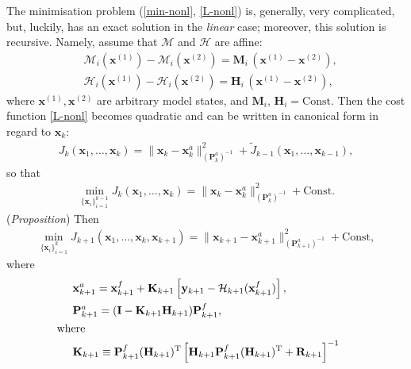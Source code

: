 \documentclass[11pt]{report}
\newcommand{\mb} {\mathbf}
\newcommand{\T}{^{\tiny \mathrm T}}
\begin{document}
The minimisation problem (\ref{min-nonl}, \ref{L-nonl}) is, generally, very complicated, but, luckily, has an exact solution in the \emph{linear} case; moreover, this solution is recursive.
Namely, assume that $\mathcal M$ and $\mathcal H$ are affine:
\begin{subequations}
  \label{lin}
  \begin{align}
    \label{lin-M}
    &\mathcal M_i(\mb x^{(1)}) - \mathcal M_i(\mb x^{(2)}) = \mb M_i \, (\mb x^{(1)} - \mb x^{(2)}),\\
    \label{lin-H}
    &\mathcal H_i(\mb x^{(1)}) - \mathcal H_i(\mb x^{(2)}) = \mb H_i \, (\mb x^{(1)} - \mb x^{(2)}),
  \end{align}
\end{subequations}
where $\mb x^{(1)}, \mb x^{(2)}$ are arbitrary model states, and $\mb M_i,\, \mb H_i = \mathrm{Const}$.
Then the cost function \eqref{L-nonl} becomes quadratic and can be written in canonical form in regard to $\mb x_k$:
\begin{align*}
   J_k(\mb x_1, \dots, \mb x_k) = \|\mb x_k - \mb x_k^a\|^2_{(\mb P_{k}^a)^{-1}} + \tilde{{J}}_{k-1}(\mb x_1,\dots,\mb x_{k-1}),
\end{align*}
so that
\begin{align}
  \label{min-xk}
  \underset {\{\mb x_i\}_{i = 1}^{k - 1}}{\min} J_k(\mb x_1, \dots, \mb x_k) = \|\mb x_k - \mb x_k^a\|^2_{(\mb P_{k}^a)^{-1}} + \mathrm{Const}.
\end{align}
(\emph{Proposition}) Then
\begin{align}
  \label{min-xkp1}
    \underset {\{\mb x_i\}_{i = 1}^{k}}{\min} J_{k+1}(\mb x_1, \dots, \mb x_k, \mb x_{k+1}) = \|\mb x_{k+1} - \mb x_{k+1}^a\|^2_{(\mb P_{k+1}^a)^{-1}} + \mathrm{Const},
\end{align}
where
\begin{subequations}
  \label{kf-an}
  \begin{align}
    \label{kf-an-x}
    & \mb x_{k+1}^a = \mb x_{k+1}^f + \mb K_{k+1} \left [\mb y_{k+1} - \mathcal H_{k+1}(\mb x_{k+1}^f) \right ],\\
    \label{kf-an-P}
    & \mb P_{k+1}^a = (\mb I - \mb K_{k+1} \mb H_{k+1}) \mb P_{k+1}^f,\\
    \nonumber
    & \hspace{-0.5cm} \text{where}\\
    \label{kf-K}
    & \mb K_{k+1} \equiv \mb P^f_{k+1} (\mb H_{k+1})\T \left [\mb H_{k+1} \mb P_{k+1}^f (\mb H_{k+1})\T + \mb R_{k+1} \right ]^{-1}
  \end{align}
\end{subequations}
\end{document}
